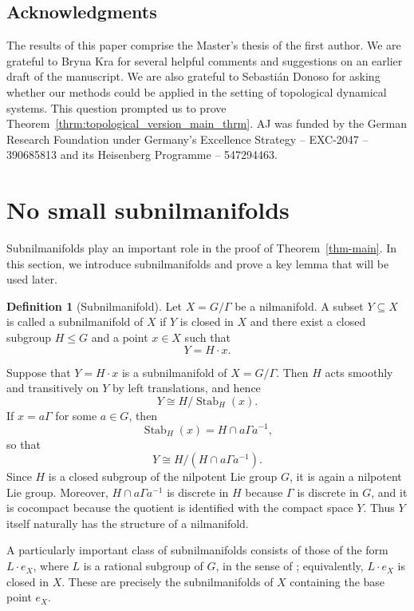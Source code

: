 \documentclass[12pt]{amsart}
\theoremstyle{plain}
\theoremstyle{definition}
\newtheorem{definition}[theorem]{Definition}
\DeclareMathOperator{\Stab}{Stab}
\begin{document}
\subsection*{Acknowledgments}
The results of this paper comprise the Master's thesis of the first author.
We are grateful to Bryna Kra for several helpful comments and suggestions on
an earlier draft of the manuscript. We are also grateful to Sebasti\'an Donoso
for asking whether our methods could be applied in the setting of topological
dynamical systems. This question prompted us to prove
Theorem~\ref{thrm:topological_version_main_thrm}. 
AJ was funded by the German Research Foundation under Germany's Excellence Strategy -- EXC-2047 -- 390685813 and its Heisenberg Programme --  547294463. 


\section{No small subnilmanifolds}\label{sec:nosmall}

Subnilmanifolds play an important role in the proof of Theorem~\ref{thm-main}. In this section, we introduce subnilmanifolds and prove a key lemma that will be used later.

\begin{definition}[Subnilmanifold]
    Let $X = G/\Gamma$ be a nilmanifold. A subset $Y \subseteq X$ is called a subnilmanifold of $X$ if $Y$ is closed in $X$ and there exist a closed subgroup $H \leq G$ and a point $x \in X$ such that
    \[
    Y = H \cdot x.
    \]
\end{definition}

Suppose that $Y = H \cdot x$ is a subnilmanifold of $X = G/\Gamma$. Then $H$ acts smoothly and transitively on $Y$ by left translations, and hence
\[
Y \cong H/\Stab_H(x).
\]
If $x = a\Gamma$ for some $a \in G$, then
\[
\Stab_H(x) = H \cap a\Gamma a^{-1},
\]
so that
\[
Y \cong H/(H \cap a\Gamma a^{-1}).
\]
Since $H$ is a closed subgroup of the nilpotent Lie group $G$, it is again a nilpotent Lie group. Moreover, $H \cap a\Gamma a^{-1}$ is discrete in $H$ because $\Gamma$ is discrete in $G$, and it is cocompact because the quotient is identified with the compact space $Y$. Thus $Y$ itself naturally has the structure of a nilmanifold.

A particularly important class of subnilmanifolds consists of those of the form $L \cdot e_X$, where $L$ is a rational subgroup of $G$, in the sense of \cite[Chapter~10, Lemma~14]{hk-book}; equivalently, $L \cdot e_X$ is closed in $X$. These are precisely the subnilmanifolds of $X$ containing the base point $e_X$.
\end{document}

